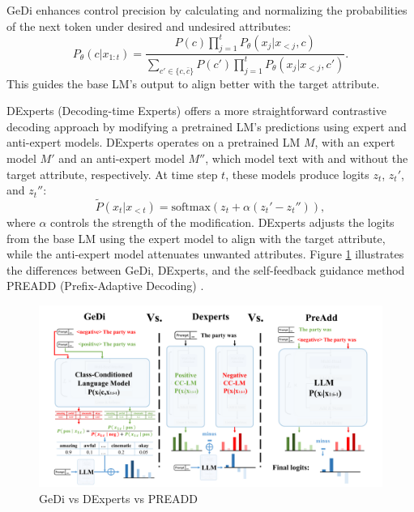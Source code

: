 \documentclass[acmsmall, screen]{acmart}
\begin{document}
GeDi enhances control precision by calculating and normalizing the probabilities of the next token under desired and undesired attributes:
\begin{equation}
P_\theta(c|x_{1:t}) = \frac{P(c) \prod_{j=1}^t P_\theta(x_j|x_{<j}, c)}{\sum_{c' \in \{c, \bar{c}\}} P(c') \prod_{j=1}^t P_\theta(x_j|x_{<j}, c')}.
\end{equation}
This guides the base LM's output to align better with the target attribute.

DExperts (Decoding-time Experts) \cite{liu_acl21_DExperts} offers a more straightforward contrastive decoding approach by modifying a pretrained LM's predictions using expert and anti-expert models. DExperts operates on a pretrained LM \( M \), with an expert model \( M' \) and an anti-expert model \( M'' \), which model text with and without the target attribute, respectively. At time step \( t \), these models produce logits \( z_t \), \( z_t' \), and \( z_t'' \):
\begin{equation}
\tilde{P}(x_t | x_{<t}) = \text{softmax}(z_t + \alpha (z_t' - z_t'')),
\end{equation}
where \(\alpha\) controls the strength of the modification. DExperts adjusts the logits from the base LM using the expert model to align with the target attribute, while the anti-expert model attenuates unwanted attributes. Figure \ref{fig:gedi_vs_dexperts_vs_preadd} illustrates the differences between GeDi, DExperts, and the self-feedback guidance method PREADD (Prefix-Adaptive Decoding) \cite{pei_acl23_PREADD}.

\begin{figure}[htbp]
    \centering
    \includegraphics[width=\textwidth]{figures/gedi_vs_dexperts_vs_preadd.pdf}
    \caption{GeDi vs DExperts vs PREADD}
    \label{fig:gedi_vs_dexperts_vs_preadd}
\end{figure}
\end{document}

